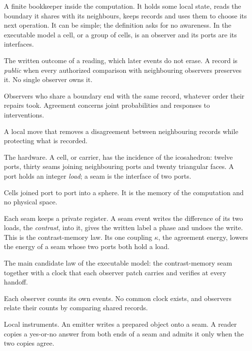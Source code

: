 \documentclass[11pt]{article}
\theoremstyle{definition}
\theoremstyle{remark}
\begin{document}
\begin{description}[leftmargin=1.2em,itemsep=1pt,parsep=0pt]
\item[Observer, or observer patch.] A finite bookkeeper inside the
computation. It holds some local state, reads the boundary it shares
with its neighbours, keeps records and uses them to choose its next
operation. It can be simple; the definition asks for no awareness. In
the executable model a cell, or a group of cells, is an observer and its
ports are its interfaces.
\item[Record.] The written outcome of a reading, which later events do
not erase. A record is \emph{public} when every authorized comparison
with neighbouring observers preserves it. No single observer owns it.
\item[Agreement.] Observers who share a boundary end with the same
record, whatever order their repairs took. Agreement concerns joint
probabilities and responses to interventions.
\item[Repair.] A local move that removes a disagreement between
neighbouring records while protecting what is recorded.
\item[Cell, port and seam.] The hardware. A cell, or carrier, has the
incidence of the icosahedron: twelve ports, thirty seams joining
neighbouring ports and twenty triangular faces. A port holds an integer
\emph{load}; a seam is the interface of two ports.
\item[Federation, or screen.] Cells joined port to port into a sphere.
It is the memory of the computation and no physical space.
\item[Seam memory and the echo.] Each seam keeps a private register. A
seam event writes the difference of its two loads, the \emph{contrast},
into it, gives the written label a phase and undoes the write. This is
the contrast-memory law. Its one coupling $\kappa$, the agreement
energy, lowers the energy of a seam whose two ports both hold a load.
\item[Interval Echo.] The main candidate law of the executable model:
the contrast-memory seam together with a clock that each observer patch
carries and verifies at every handoff.
\item[Own clock.] Each observer counts its own events. No common clock
exists, and observers relate their counts by comparing shared records.
\item[Emitter and reader.] Local instruments. An emitter writes a
prepared object onto a seam. A reader copies a yes-or-no answer from
both ends of a seam and admits it only when the two copies agree.

\end{description}
\end{document}
